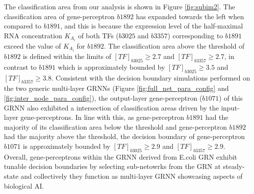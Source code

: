 \documentclass[twocolumn]{biophys-new}
\begin{document}
{{The classification area from our analysis is shown in Figure \ref{fig:subim2}. The classification area of gene-perceptron $b1892$ has expanded towards the left when compared to $b1891$, and this is because the expression level of the half-maximal RNA concentration  $K_{A_i}$ of both TFs ($b3025$ and $b3357$) corresponding to $b1891$ exceed the value of $K_{A_i}$ for $b1892$. 
The classification area above the threshold of $b1892$ is defined within the limits of $[TF]_{b3025} \geq 2.7 $ and $[TF]_{b3357} \geq 2.7 $, in contrast to  $b1891$ which is approximately bounded by $[TF]_{b3025}\geq3.5$ and $[TF]_{b3357}\geq3.8 $.  
Consistent with the decision boundary simulations performed on the two generic multi-layer GRNNs (Figure \ref{fig:full_net_para_config} and \ref{fig:inter_node_para_config}), the output-layer gene-perceptron ($b1071$) of this GRNN also  exhibited a intersection of classification areas driven by the  input-layer gene-perceptrons. In line with this, as gene-perceptron $b1891$ had the majority of its classification area below the threshold and gene-perceptron $b1892$ had the majority above the threshold, the decision boundary of gene-perceptron $b1071$  is approximately bounded by $[TF]_{b3025} \geq 2.9$ and $[TF]_{b3357} \geq 2.9$. Overall, gene-perceptrons within the GRNN derived from  E.coli GRN exhibit  tunable decision boundaries by selecting sub-netowrks from the GRN  at  steady-state and collectively they function as multi-layer GRNN showcasing aspects of biological AI.   





}}
\end{document}
